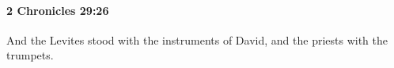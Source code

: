 
		\paragraph{2 Chronicles 29:26} %
			\label{2CHRONICLES-29-26}

			And the Levites stood with the instruments of David, and the priests with the trumpets.


